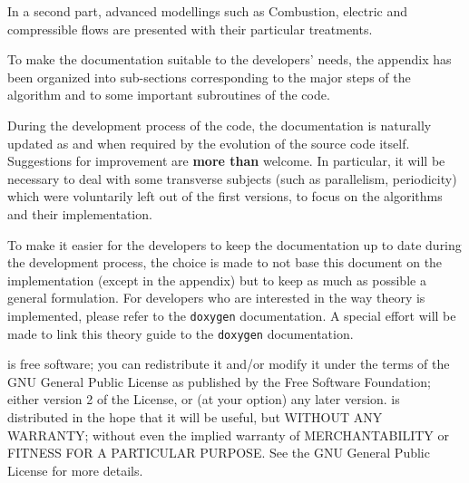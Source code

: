 In a second part, advanced modellings such as Combustion, electric and compressible flows
 are presented with their particular treatments.

To make the documentation suitable to the developers' needs, the appendix
has been organized into sub-sections corresponding to the major steps of the
algorithm and to some important subroutines of the code.

During the development process of the code, the documentation is naturally
updated as and when required by the evolution of the source code itself.
Suggestions for improvement are \textbf{more than} welcome. In particular,
it will be necessary to deal with some transverse subjects
(such as parallelism, periodicity) which were voluntarily left out of
the first versions, to focus on the algorithms and their implementation.

To make it easier for the developers to keep the documentation up to date
during the development process, the choice is made to not base this document
on the implementation (except in the appendix) but to keep as much as possible
a general formulation. For developers who are interested in the way theory is
implemented, please refer to the \texttt{doxygen} documentation.
A special effort will be made to link this theory guide to the \texttt{doxygen}
documentation.

\CS is free software; you can redistribute it
and/or modify it under the terms of the GNU General Public License
as published by the Free Software Foundation; either version 2 of
the License, or (at your option) any later version.
\CS is distributed in the hope that it will be
useful, but WITHOUT ANY WARRANTY; without even the implied warranty
of MERCHANTABILITY or FITNESS FOR A PARTICULAR PURPOSE.  See the
GNU General Public License for more details.

%

%
%
%
%
